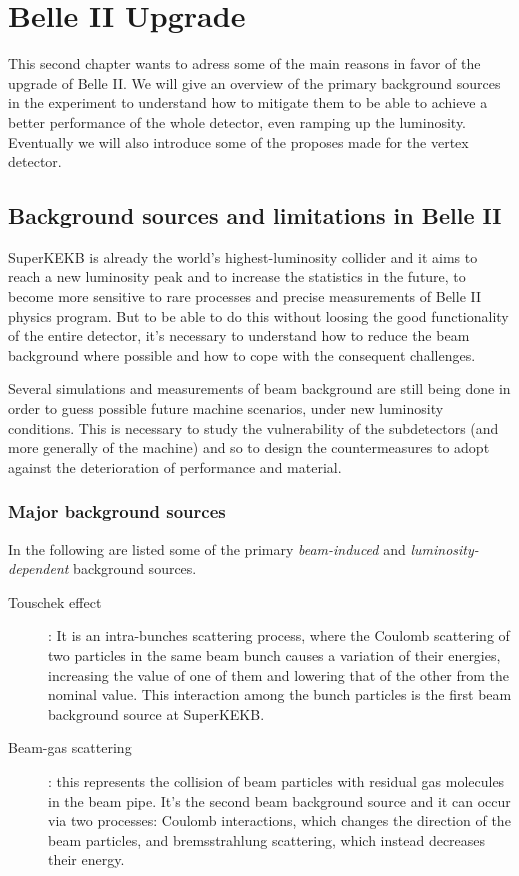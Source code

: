 \chapter{Belle II Upgrade}

This second chapter wants to adress some of the main reasons in favor of the upgrade of Belle II. We will give an overview of the primary background sources in the experiment to understand how to mitigate them to be able to achieve a better performance of the whole detector, even ramping up the luminosity. Eventually we will also introduce some of the proposes made for the vertex detector.



\section{Background sources and limitations in Belle II}

SuperKEKB is already the world's highest-luminosity collider and it aims to reach a new luminosity peak and to increase the statistics in the future, to become more sensitive to rare processes and precise measurements of Belle II physics program. 
But to be able to do this without loosing the good functionality of the entire detector, it's necessary to understand how to reduce the beam background where possible and how to cope with the consequent challenges.

Several simulations and measurements of beam background are still being done in order to guess possible future machine scenarios, under new luminosity conditions.
This is necessary to study the vulnerability of the subdetectors (and more generally of the machine) and so to design the countermeasures to adopt against the deterioration of performance and material.


\subsection{Major background sources}

In the following are listed some of the primary \textit{beam-induced} and \textit{luminosity-dependent} background sources.


\begin{description}
\item[Touschek effect]: 
	It is an intra-bunches scattering process, where the Coulomb scattering of two particles in the same beam bunch causes a variation of their energies, increasing the value of one of them and lowering that of the other from the nominal value. This interaction among the bunch particles is the first beam background source at SuperKEKB.
\item[Beam-gas scattering]: 
	this represents the collision of beam particles with residual gas molecules in the beam pipe. It's the second beam background source and it can occur via two processes: Coulomb interactions, which changes the direction of the beam particles, and bremsstrahlung scattering, which instead decreases their energy. 
\end{description}
	
